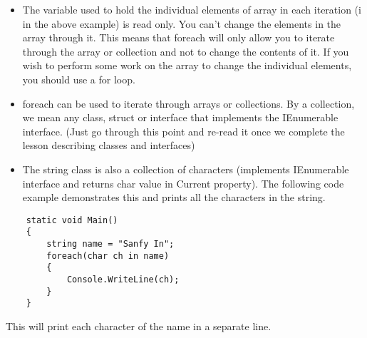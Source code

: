 \begin{itemize}
    \item The variable used to hold the individual elements of array in each iteration (i in the above example) is read
    only. You can’t change the elements in the array through it. This means that foreach will only allow you to
    iterate through the array or collection and not to change the contents of it. If you wish to perform some
    work on the array to change the individual elements, you should use a for loop.
    \item foreach can be used to iterate through arrays or collections. By a collection, we mean any class, struct or
    interface that implements the IEnumerable interface. (Just go through this point and re-read it once we
    complete the lesson describing classes and interfaces)
    \item The string class is also a collection of characters (implements IEnumerable interface and returns char
    value in Current property). The following code example demonstrates this and prints all the characters in
    the string.
     
\end{itemize}

\begin{lstlisting}
    static void Main()
    {
        string name = "Sanfy In";
        foreach(char ch in name)
        {
            Console.WriteLine(ch);
        }
    } 
\end{lstlisting}

This will print each character of the name in a separate line.
